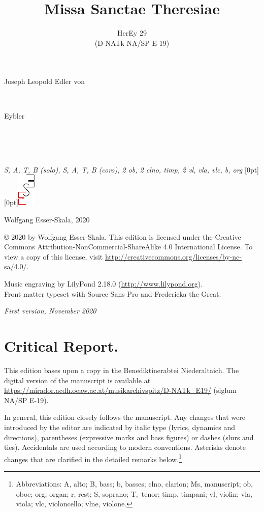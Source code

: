 \documentclass[parskip=full]{scrreprt}
\makeatletter
\DeclareRobustCommand{\sbseries}{\fontseries{sb}\selectfont}
\newcommand\fancytitlehead{
	\headingfont%
	\fontsize{80}{80}\selectfont\textcolor{black!80}{\@ifundefined{@shortname}{\@lastname}{\@shortname}.}\\[15pt]%
	\fontsize{55}{55}\selectfont\@ifundefined{@shorttitle}{\@title}{\@shorttitle}.%
}
\def\firstname#1{\def\@firstname{#1}}
\def\lastname#1{\def\@lastname{#1}}
\def\shorttitle#1{\def\@shorttitle{#1}}
\def\instrumentation#1{\def\@instrumentation{#1}}
\def\maketitle{%
\begin{titlepage}%
	\Large%
	{\@titlehead}%
	\vfill%
	{\strut\@firstname}\\%
	{\sbseries\color{oldred}\strut\@lastname}\\%
	{\strut\@namesuffix}%
	\vfill%
	{\sbseries\@title}\\%
	{\@subtitle}\\[\baselineskip]%
	{\itshape\@instrumentation}%
	\vfill%
	{\itshape\@parts}\hspace*{\fill}\raisebox{0pt}[0pt][0pt]{\includegraphics{ees_logo}}%
\end{titlepage}%
}
\newif\ifprintreport\printreportfalse
\makeatother
\begin{document}
\frenchspacing

\titlehead{\fancytitlehead}
\firstname{Joseph Leopold Edler von}
\lastname{Eybler}
\title{Missa Sanctae Theresiae}
\shorttitle{Missa S. Theresiae}
\subtitle{HerEy 29\\(D-NATk NA/SP E-19)}
\instrumentation{S, A, T, B (solo), S, A, T, B (coro), 2 ob, 2 clno, timp, 2 vl, vla, vlc, b, org}
\maketitle


\thispagestyle{empty}

\vspace*{\fill}

\hspace*{1em}Wolfgang Esser-Skala, 2020

© 2020 by Wolfgang Esser-Skala. This edition is licensed under the Creative Commons Attribution-NonCommercial-ShareAlike 4.0 International License. To view a copy of this license, visit \url{http://creativecommons.org/licenses/by-nc-sa/4.0/}. 

Music engraving by LilyPond 2.18.0 (\url{http://www.lilypond.org}).\\
Front matter typeset with Source Sans Pro and Fredericka the Great.

\textit{First version, November 2020}

\vspace*{2cm}

\ifprintreport
\chapter*{Critical Report.}

This edition bases upon a copy in the Benediktinerabtei Niederaltaich. The digital version of the manuscript is available at \url{https://mirador.acdh.oeaw.ac.at/musikarchivspitz/D-NATk_E19/} (siglum NA/SP E-19).

In general, this edition closely follows the manuscript. Any changes that were introduced by the editor are indicated by italic type (lyrics, dynamics and directions), parentheses (expressive marks and bass figures) or dashes (slurs and ties). Accidentals are used according to modern conventions. Asterisks denote changes that are clarified in the detailed remarks below.\footnote{Abbreviations: A, alto; B, bass; b, basses; clno, clarion; Ms, manuscript; ob, oboe; org, organ; r, rest; S, soprano; T,~tenor; timp, timpani; vl, violin; vla, viola; vlc, violoncello; vlne, violone.}
\end{document}
